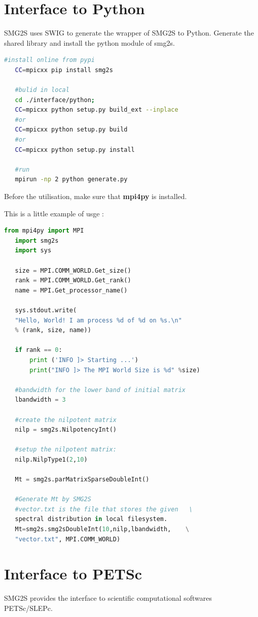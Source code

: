 \documentclass[a4paper, 10 pt]{report}
\begin{document}
	\section{Interface to Python}
	
	SMG2S uses SWIG to generate the wrapper of SMG2S to Python. Generate the shared library and install the python module of smg2s.
	\begin{lstlisting}[language=bash,frame=single]
   #install online from pypi
   CC=mpicxx pip install smg2s
	
   #bulid in local
   cd ./interface/python;
   CC=mpicxx python setup.py build_ext --inplace
   #or
   CC=mpicxx python setup.py build
   #or
   CC=mpicxx python setup.py install

   #run
   mpirun -np 2 python generate.py
	\end{lstlisting}
	
	Before the utilisation, make sure that \textbf{mpi4py} is installed.
	
   This is	a little example of usge :
	\begin{lstlisting}[language=Python,frame=single]
   from mpi4py import MPI
   import smg2s
   import sys

   size = MPI.COMM_WORLD.Get_size()
   rank = MPI.COMM_WORLD.Get_rank()
   name = MPI.Get_processor_name()

   sys.stdout.write(
   "Hello, World! I am process %d of %d on %s.\n"
   % (rank, size, name))

   if rank == 0:
       print ('INFO ]> Starting ...')
       print("INFO ]> The MPI World Size is %d" %size)

   #bandwidth for the lower band of initial matrix
   lbandwidth = 3

   #create the nilpotent matrix
   nilp = smg2s.NilpotencyInt()

   #setup the nilpotent matrix:
   nilp.NilpType1(2,10)

   Mt = smg2s.parMatrixSparseDoubleInt()

   #Generate Mt by SMG2S
   #vector.txt is the file that stores the given   \
   spectral distribution in local filesystem.
   Mt=smg2s.smg2sDoubleInt(10,nilp,lbandwidth,    \
   "vector.txt", MPI.COMM_WORLD)
	\end{lstlisting}
	\section{Interface to PETSc}
	
	SMG2S provides the interface to scientific computational softwares PETSc/SLEPc.
	
\end{document}
